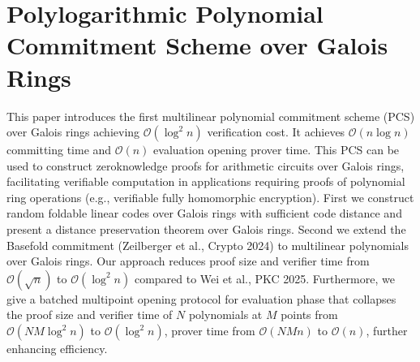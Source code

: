 \documentclass[11pt,oneside]{book}
\theoremstyle{definition}
\theoremstyle{remark}
\theoremstyle{plain}
\begin{document}
\section{\cite{10.1007/978-3-032-07891-9_21} Polylogarithmic Polynomial Commitment Scheme over Galois Rings}
This paper introduces the first multilinear polynomial commitment scheme (PCS) over Galois rings achieving $\mathcal{O}\left(\log ^2 n\right)$ verification cost. It achieves $\mathcal{O}(n \log n)$ committing time and $\mathcal{O}(n)$ evaluation opening prover time. This PCS can be used to construct zeroknowledge proofs for arithmetic circuits over Galois rings, facilitating verifiable computation in applications requiring proofs of polynomial ring operations (e.g., verifiable fully homomorphic encryption). First we construct random foldable linear codes over Galois rings with sufficient code distance and present a distance preservation theorem over Galois rings. Second we extend the Basefold commitment (Zeilberger et al., Crypto 2024) to multilinear polynomials over Galois rings. Our approach reduces proof size and verifier time from $\mathcal{O}(\sqrt{n})$ to $\mathcal{O}\left(\log ^2 n\right)$ compared to Wei et al., PKC 2025. Furthermore, we give a batched multipoint opening protocol for evaluation phase that collapses the proof size and verifier time of $N$ polynomials at $M$ points from $\mathcal{O}\left(N M \log ^2 n\right)$ to $\mathcal{O}\left(\log ^2 n\right)$, prover time from $\mathcal{O}(N M n)$ to $\mathcal{O}(n)$, further enhancing efficiency.



%
%
\printbibliography
\end{document}
